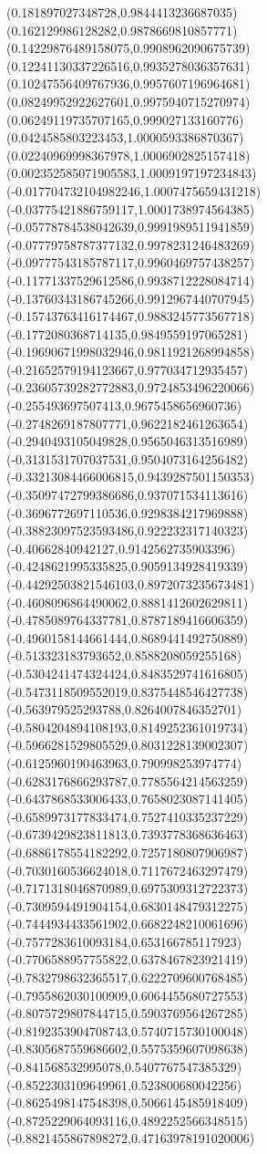 {(0.181897027348728,0.9844413236687035)
(0.162129986128282,0.9878669810857771)
(0.14229876489158075,0.9908962090675739)
(0.12241130337226516,0.9935278036357631)
(0.10247556409767936,0.9957607196964681)
(0.08249952922627601,0.9975940715270974)
(0.06249119735707165,0.999027133160776)
(0.0424585803223453,1.0000593386870367)
(0.02240969998367978,1.0006902825157418)
(0.002352585071905583,1.0009197197234843)
(-0.017704732104982246,1.0007475659431218)
(-0.03775421886759117,1.0001738974564385)
(-0.05778784538042639,0.9991989511941859)
(-0.07779758787377132,0.9978231246483269)
(-0.09777543185787117,0.9960469757438257)
(-0.11771337529612586,0.9938712228084714)
(-0.13760343186745266,0.9912967440707945)
(-0.15743763416174467,0.9883245773567718)
(-0.1772080368714135,0.9849559197065281)
(-0.19690671998032946,0.9811921268994858)
(-0.21652579194123667,0.977034712935457)
(-0.23605739282772883,0.9724853496220066)
(-0.255493697507413,0.9675458656960736)
(-0.2748269187807771,0.9622182461263654)
(-0.2940493105049828,0.9565046313516989)
(-0.3131531707037531,0.9504073164256482)
(-0.33213084466006815,0.9439287501150353)
(-0.35097472799386686,0.937071534113616)
(-0.3696772697110536,0.9298384217969888)
(-0.38823097523593486,0.922232317140323)
(-0.40662840942127,0.9142562735903396)
(-0.4248621995335825,0.9059134928419339)
(-0.44292503821546103,0.8972073235673481)
(-0.4608096864490062,0.8881412602629811)
(-0.4785089764337781,0.8787189416606359)
(-0.4960158144661444,0.8689441492750889)
(-0.513323183793652,0.8588208059255168)
(-0.5304241474324424,0.8483529741616805)
(-0.5473118509552019,0.8375448546427738)
(-0.563979525293788,0.8264007846352701)
(-0.5804204894108193,0.8149252361019734)
(-0.5966281529805529,0.8031228139002307)
(-0.6125960190463963,0.790998253974774)
(-0.6283176866293787,0.7785564214563259)
(-0.6437868533006433,0.7658023087141405)
(-0.6589973177833474,0.7527410335237229)
(-0.6739429823811813,0.7393778368636463)
(-0.6886178554182292,0.7257180807906987)
(-0.7030160536624018,0.7117672463297479)
(-0.7171318046870989,0.6975309312722373)
(-0.7309594491904154,0.6830148479312275)
(-0.7444934433561902,0.6682248210061696)
(-0.7577283610093184,0.653166785117923)
(-0.7706588957755822,0.6378467823921419)
(-0.7832798632365517,0.6222709600768485)
(-0.7955862030100909,0.6064455680727553)
(-0.8075729807844715,0.5903769564267285)
(-0.8192353904708743,0.5740715730100048)
(-0.8305687559686602,0.5575359607098638)
(-0.841568532995078,0.5407767547385329)
(-0.8522303109649961,0.523800680042256)
(-0.8625498147548398,0.5066145485918409)
(-0.8725229064093116,0.4892252566348515)
(-0.8821455867898272,0.47163978191020006)
}

